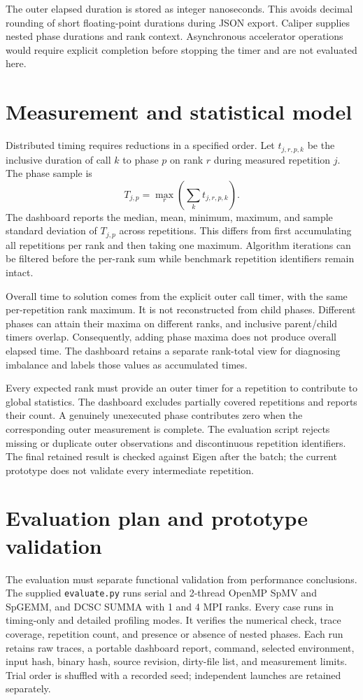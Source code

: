 \documentclass[10pt]{article}
\begin{document}
The outer elapsed duration is stored as integer nanoseconds. This avoids decimal
rounding of short floating-point durations during JSON export. Caliper supplies
nested phase durations and rank context. Asynchronous accelerator operations would
require explicit completion before stopping the timer and are not evaluated here.

\section{Measurement and statistical model}
Distributed timing requires reductions in a specified order. Let $t_{j,r,p,k}$ be
the inclusive duration of call $k$ to phase $p$ on rank $r$ during measured repetition
$j$. The phase sample is
\[
 T_{j,p}=\max_r\left(\sum_k t_{j,r,p,k}\right).
\]
The dashboard reports the median, mean, minimum, maximum, and sample standard
deviation of $T_{j,p}$ across repetitions. This differs from first accumulating all
repetitions per rank and then taking one maximum. Algorithm iterations can be filtered
before the per-rank sum while benchmark repetition identifiers remain intact.

Overall time to solution comes from the explicit outer call timer, with the same
per-repetition rank maximum. It is not reconstructed from child phases. Different
phases can attain their maxima on different ranks, and inclusive parent/child timers
overlap. Consequently, adding phase maxima does not produce overall elapsed time.
The dashboard retains a separate rank-total view for diagnosing imbalance and labels
those values as accumulated times.

Every expected rank must provide an outer timer for a repetition to contribute to
global statistics. The dashboard excludes partially covered repetitions and reports
their count. A genuinely unexecuted phase contributes zero when the corresponding
outer measurement is complete. The evaluation script rejects missing or duplicate
outer observations and discontinuous repetition identifiers. The final retained result
is checked against Eigen after the batch; the current prototype does not validate
every intermediate repetition.

\section{Evaluation plan and prototype validation}
The evaluation must separate functional validation from performance conclusions.
The supplied \texttt{evaluate.py} runs serial and 2-thread OpenMP SpMV and SpGEMM,
and DCSC SUMMA with 1 and 4 MPI ranks. Every case runs in timing-only and detailed
profiling modes. It verifies the numerical check, trace coverage, repetition count,
and presence or absence of nested phases. Each run retains raw traces, a portable
dashboard report, command, selected environment, input hash, binary hash, source
revision, dirty-file list, and measurement limits. Trial order is shuffled with a
recorded seed; independent launches are retained separately.
\end{document}
